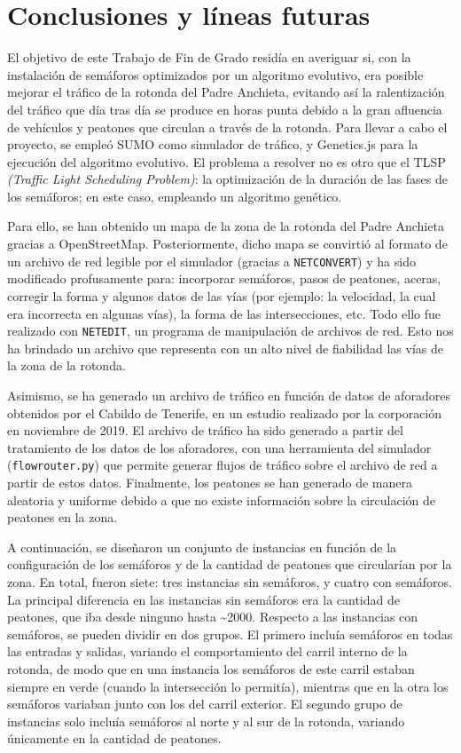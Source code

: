 \chapter{Conclusiones y líneas futuras}
\label{cap:conclusiones}

El objetivo de este Trabajo de Fin de Grado residía en averiguar si, con la instalación de semáforos optimizados por un algoritmo evolutivo, era posible mejorar el tráfico de la rotonda del Padre Anchieta, evitando así la ralentización del tráfico que día tras día se produce en horas punta debido a la gran afluencia de vehículos y peatones que circulan a través de la rotonda. Para llevar a cabo el proyecto, se empleó SUMO como simulador de tráfico, y Genetics.js para la ejecución del algoritmo evolutivo. El problema a resolver no es otro que el TLSP \textit{(Traffic Light Scheduling Problem)}: la optimización de la duración de las fases de los semáforos; en este caso, empleando un algoritmo genético.

Para ello, se han obtenido un mapa de la zona de la rotonda del Padre Anchieta gracias a OpenStreetMap. Posteriormente, dicho mapa se convirtió al formato de un archivo de red legible por el simulador (gracias a \texttt{NETCONVERT}) y ha sido modificado profusamente para: incorporar semáforos, pasos de peatones, aceras, corregir la forma y algunos datos de las vías (por ejemplo: la velocidad, la cual era incorrecta en algunas vías), la forma de las intersecciones, etc. Todo ello fue realizado con \texttt{NETEDIT}, un programa de manipulación de archivos de red. Esto nos ha brindado un archivo que representa con un alto nivel de fiabilidad las vías de la zona de la rotonda. 

Asimismo, se ha generado un archivo de tráfico en función de datos de aforadores obtenidos por el Cabildo de Tenerife, en un estudio realizado por la corporación en noviembre de 2019. El archivo de tráfico ha sido generado a partir del tratamiento de los datos de los aforadores, con una herramienta del simulador (\texttt{flowrouter.py}) que permite generar flujos de tráfico sobre el archivo de red a partir de estos datos. Finalmente, los peatones se han generado de manera aleatoria y uniforme debido a que no existe información sobre la circulación de peatones en la zona.

A continuación, se diseñaron un conjunto de instancias en función de la configuración de los semáforos y de la cantidad de peatones que circularían por la zona. En total, fueron siete: tres instancias sin semáforos, y cuatro con semáforos. La principal diferencia en las instancias sin semáforos era la cantidad de peatones, que iba desde ninguno hasta \textasciitilde2000. Respecto a las instancias con semáforos, se pueden dividir en dos grupos. El primero incluía semáforos en todas las entradas y salidas, variando el comportamiento del carril interno de la rotonda, de modo que en una instancia los semáforos de este carril estaban siempre en verde (cuando la intersección lo permitía), mientras que en la otra los semáforos variaban junto con los del carril exterior. El segundo grupo de instancias solo incluía semáforos al norte y al sur de la rotonda, variando únicamente en la cantidad de peatones.

